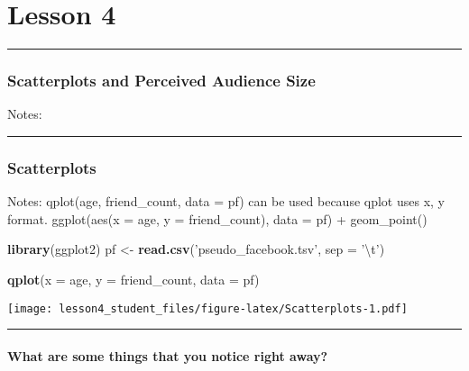 \documentclass[]{article}
\title{}
\author{}
\date{}
\newenvironment{Shaded}{\begin{snugshade}}{\end{snugshade}}
\newcommand{\KeywordTok}[1]{\textcolor[rgb]{0.13,0.29,0.53}{\textbf{#1}}}
\newcommand{\DataTypeTok}[1]{\textcolor[rgb]{0.13,0.29,0.53}{#1}}
\newcommand{\CharTok}[1]{\textcolor[rgb]{0.31,0.60,0.02}{#1}}
\newcommand{\StringTok}[1]{\textcolor[rgb]{0.31,0.60,0.02}{#1}}
\newcommand{\NormalTok}[1]{#1}
\let\oldparagraph\paragraph
\renewcommand{\paragraph}[1]{\oldparagraph{#1}\mbox{}}
\begin{document}
\section{Lesson 4}\label{lesson-4}

\begin{center}\rule{0.5\linewidth}{\linethickness}\end{center}

\subsubsection{Scatterplots and Perceived Audience
Size}\label{scatterplots-and-perceived-audience-size}

Notes:

\begin{center}\rule{0.5\linewidth}{\linethickness}\end{center}

\subsubsection{Scatterplots}\label{scatterplots}

Notes: qplot(age, friend\_count, data = pf) can be used because qplot
uses x, y format. ggplot(aes(x = age, y = friend\_count), data = pf) +
geom\_point()

\begin{Shaded}
\begin{Highlighting}[]
\KeywordTok{library}\NormalTok{(ggplot2)}
\NormalTok{pf <-}\StringTok{ }\KeywordTok{read.csv}\NormalTok{(}\StringTok{'pseudo_facebook.tsv'}\NormalTok{, }\DataTypeTok{sep =} \StringTok{'}\CharTok{\textbackslash{}t}\StringTok{'}\NormalTok{)}

\KeywordTok{qplot}\NormalTok{(}\DataTypeTok{x =}\NormalTok{ age, }\DataTypeTok{y =}\NormalTok{ friend_count, }\DataTypeTok{data =}\NormalTok{ pf)}
\end{Highlighting}
\end{Shaded}

\texttt{[image: lesson4\_student\_files/figure-latex/Scatterplots-1.pdf]}

\begin{center}\rule{0.5\linewidth}{\linethickness}\end{center}

\paragraph{What are some things that you notice right
away?}\label{what-are-some-things-that-you-notice-right-away}
\end{document}
